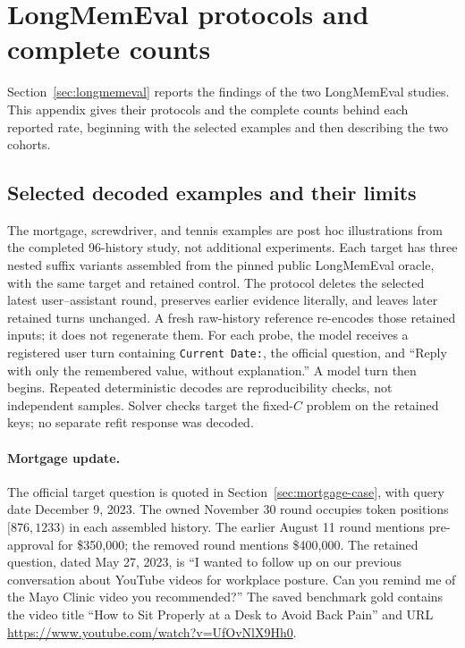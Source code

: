 \section{LongMemEval protocols and complete counts}\label{app:longmemeval}

Section~\ref{sec:longmemeval} reports the findings of the two LongMemEval
studies. This appendix gives their protocols and the complete counts behind
each reported rate, beginning with the selected examples and then describing
the two cohorts.

\subsection{Selected decoded examples and their limits}\label{app:decoded-cases}

The mortgage, screwdriver, and tennis examples are post hoc illustrations
from the completed 96-history study, not additional experiments. Each target
has three nested suffix variants assembled from the pinned public LongMemEval
oracle, with the same target and retained control. The protocol deletes the
selected latest user--assistant round, preserves earlier evidence literally,
and leaves later retained turns unchanged. A fresh raw-history reference
re-encodes those retained inputs; it does not regenerate them. For each probe,
the model receives a registered user turn containing \texttt{Current Date:},
the official question, and ``Reply with only the remembered value, without
explanation.'' A model turn then begins. Repeated deterministic decodes are
reproducibility checks, not independent samples. Solver checks target the
fixed-$C$ problem on the retained keys; no separate refit response was decoded.

\paragraph{Mortgage update.}
The official target question is quoted in Section~\ref{sec:mortgage-case},
with query date December 9, 2023. The owned November 30 round occupies token
positions $[876,1233)$ in each assembled history. The earlier August 11 round
mentions pre-approval for \$350,000; the removed round mentions \$400,000.
The retained question, dated May 27, 2023, is ``I wanted to follow up on our
previous conversation about YouTube videos for workplace posture. Can you
remind me of the Mayo Clinic video you recommended?'' The saved benchmark gold
contains the video title ``How to Sit Properly at a Desk to Avoid Back Pain''
and URL \url{https://www.youtube.com/watch?v=UfOvNlX9Hh0}.

